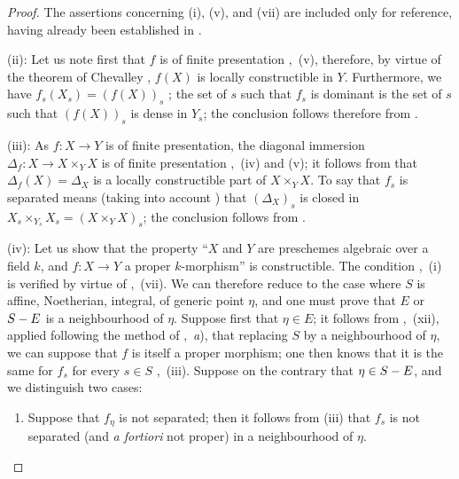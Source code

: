 \begin{proof}
The assertions concerning (i), (v), and (vii) are included only for reference, having already been established in .

(ii): Let us note first that $f$ is of finite presentation ,~(v), therefore, by virtue of the theorem of Chevalley , $f(X)$ is locally constructible in $Y$.
Furthermore, we have $f_s(X_s)=(f(X))_s$ ; the set of $s$ such that $f_s$ is dominant is the set of $s$ such that $(f(X))_s$ is dense in $Y_s$; the conclusion follows therefore from .

(iii): As $f:X\to Y$ is of finite presentation, the diagonal immersion $\Delta_f:X\to X\times_Y X$ is of finite presentation ,~(iv) and (v); it follows from  that $\Delta_f(X)=\Delta_X$ is a locally constructible part of $X\times_Y X$.
To say that $f_s$ is separated means (taking into account ) that $(\Delta_X)_s$ is closed in $X_s\times_{Y_s} X_s=(X\times_Y X)_s$; the conclusion follows from .


(iv): Let us show that the property ``$X$ and $Y$ are preschemes algebraic over a field $k$, and $f:X\to Y$ a proper $k$-morphism'' is constructible.
The condition ,~(i) is verified by virtue of ,~(vii).
We can therefore reduce to the case where $S$ is affine, Noetherian, integral, of generic point $\eta$, and one must prove that $E$ or $S- E$ is a neighbourhood of $\eta$.
Suppose first that $\eta\in E$; it follows from ,~(xii), applied following the method of ,~\emph{a}), that replacing $S$ by a neighbourhood of $\eta$, we can
suppose that $f$ is itself a proper morphism; one then knows that it is the same for $f_s$ for every $s\in S$ ,~(iii).
Suppose on the contrary that $\eta\in S- E$, and we distinguish two cases:
\begin{enumerate}[label=\upshape{$\arabic{enumi}^\circ$}]
  \item Suppose that $f_\eta$ is not separated; then it follows from (iii) that $f_s$ is not separated (and \emph{a fortiori} not proper) in a neighbourhood of $\eta$.


\end{enumerate}
\end{proof}
